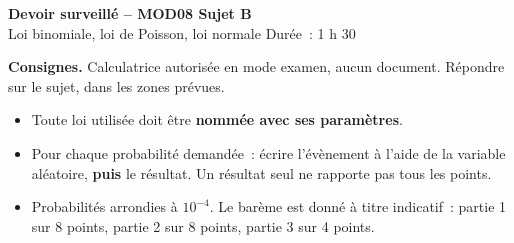 \documentclass[a4paper,11pt]{article}
\begin{document}
\begin{tcolorbox}[colback=uimmred, colframe=uimmred, sharp corners, boxrule=0pt,
  left=14pt, right=14pt, top=10pt, bottom=10pt]
{\color{white}\LARGE\bfseries Devoir surveillé -- MOD08 \hfill Sujet B}\\[4pt]
{\color{white}\large Loi binomiale, loi de Poisson, loi normale \hfill Durée~: 1 h 30}
\end{tcolorbox}

\vspace{4pt}

\begin{consigne}
\textbf{Consignes.} Calculatrice autorisée en mode examen, aucun document. Répondre sur le sujet, dans les zones prévues.
\begin{itemize}[leftmargin=12pt, itemsep=1pt, topsep=2pt]
  \item Toute loi utilisée doit être \textbf{nommée avec ses paramètres}.
  \item Pour chaque probabilité demandée~: écrire l'évènement à l'aide de la variable aléatoire, \textbf{puis} le résultat. Un résultat seul ne rapporte pas tous les points.
  \item Probabilités arrondies à $10^{-4}$. Le barème est donné à titre indicatif~: partie 1 sur 8 points, partie 2 sur 8 points, partie 3 sur 4 points.
\end{itemize}
\end{consigne}
\end{document}
